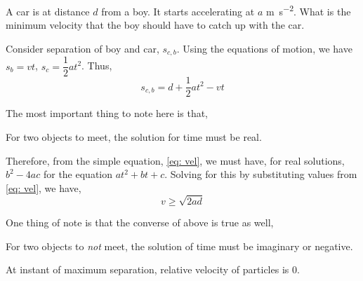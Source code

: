 \begin{example}
    A car is at distance \(d\) from a boy. It starts accelerating at \(a\) \si{\metre\per\second\squared}. What is the minimum velocity that the boy should
    have to catch up with the car.
    \begin{soln}
        Consider separation of boy and car, \(s_{c,b}\). Using the equations of motion, 
        we have \(s_{b} = vt\), \(s_{c} = \dfrac{1}{2}at^2\). Thus, 
        \begin{equation}
            \label{eq: vel}
            s_{c,b} = d + \frac{1}{2}at^2 - vt        
        \end{equation}
    
        The most important thing to note here is that, 
        \begin{moral}
            For two objects to meet, the solution for time must be real.
        \end{moral}
        Therefore, from the simple equation, \eqref{eq: vel}, we must have, for real solutions,
        \(b^2 - 4ac\) for the equation \(at^2 + bt + c\). Solving for this by substituting values from
        \eqref{eq: vel}, we have,
            \begin{equation}
                v \ge \sqrt{2ad}
            \end{equation}
    \end{soln}
\end{example}

\begin{remark}
    One thing of note is that the converse of above is true as well,
    \begin{moral}
        For two objects to \emph{not} meet, the solution of time must be imaginary or negative.    
    \end{moral}
\end{remark}


\begin{moral}
    At instant of maximum separation, relative velocity of particles is \(0\).
\end{moral}


